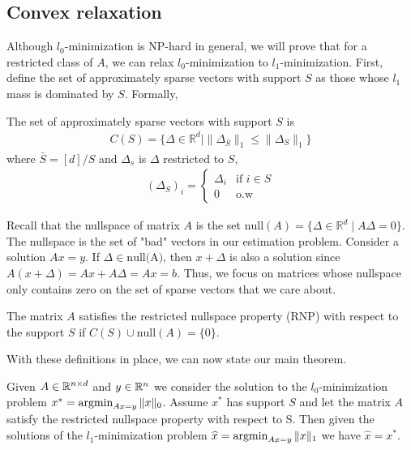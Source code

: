 \documentclass[11pt]{article}
\begin{document}
\subsection{Convex relaxation}
Although $l_0$-minimization is NP-hard in general, we will prove that for a restricted class of $A$, we can relax $l_0$-minimization to $l_1$-minimization. First, define the set of approximately sparse vectors with support $S$ as those whose $l_1$ mass is dominated by $S$. Formally,
\begin{definition}
The set of approximately sparse vectors with support $S$ is
\begin{align*}
    C(S) = \{ \Delta \in \mathbb{R}^{d} \mid \|\Delta_{\bar{S}}\|_1 \leq \|\Delta_S \|_1 \}
\end{align*}
where $\bar{S} = [d] / S$ and $\Delta_s$ is $\Delta$ restricted to $S$,
\begin{align*}
    (\Delta_{S})_i = \begin{cases}
        \Delta_i & \text{if } i \in S \\
        0 & \text{o.w}
    \end{cases}
\end{align*}
\end{definition}
Recall that the nullspace of matrix $A$ is the set $\text{null} (A) = \{ \Delta \in \mathbb{R}^{d} \mid A\Delta = 0 \}$. The nullspace is the set of "bad" vectors in our estimation problem. Consider a solution $Ax = y$. If $\Delta \in \text{null(A)}$, then $x + \Delta$ is also a solution since $A(x + \Delta) = Ax + A\Delta = Ax = b$. Thus, we focus on matrices whose nullspace only contains zero on the set of sparse vectors that we care about.
\begin{definition}
The matrix $A$ satisfies the restricted nullspace property (RNP) with respect to the support $S$ if $C(S) \cup \text{null}(A) = \{ 0 \}$.
\end{definition}
With these definitions in place, we can now state our main theorem.
\begin{theorem}
Given $A \in \mathbb{R}^{n \times d}$ and $y \in \mathbb{R}^n$ we consider the solution to the $l_0$-minimization problem $x^* = \mathop{\rm argmin}_{Ax=y}\|x\|_0$. Assume $x^*$ has support $S$ and let the matrix $A$ satisfy the restricted nullspace property with respect to S. Then given the solutions of the $l_1$-minimization problem $\widehat{x} = \mathop{\rm argmin}_{Ax=y}\|x\|_1$ we have $\hat{x} = x^*$.
\end{theorem}
\end{document}
